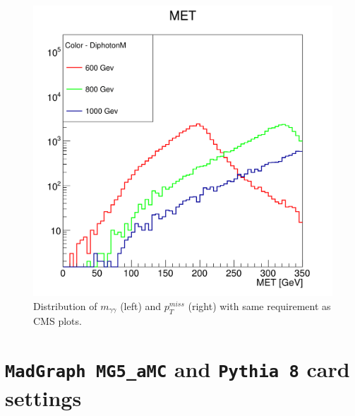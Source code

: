 \documentclass[12pt,A4paper]{article}
\begin{document}
\begin{figure}[h!]
\begin{minipage}{.5\textwidth}
  \includegraphics[scale=0.16]{img/MZp_MET-1.png}
\end{minipage}
\caption{Distribution of $m_{\gamma\gamma}$ (left) and $p_T^{miss}$ (right) with same requirement as CMS plots.}
\end{figure}

\clearpage

\appendix
\appendixpage
\addappheadtotoc

\section{\texttt{MadGraph MG5\_aMC} and \texttt{Pythia 8} card settings}\label{appmg5}
\end{document}
